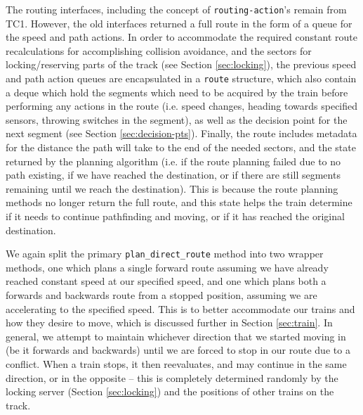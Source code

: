 \documentclass[12pt, titlepage]{article}
\begin{document}
    The routing interfaces, including the concept of \verb`routing-action`'s remain from TC1. However, the old interfaces returned a full route in the form of a queue for the speed and path actions. In order to accommodate the required constant route recalculations for accomplishing collision avoidance, and the sectors for locking/reserving parts of the track (see Section \ref{sec:locking}), the previous speed and path action queues are encapsulated in a \verb`route` structure, which also contain a deque which hold the segments which need to be acquired by the train before performing any actions in the route (i.e. speed changes, heading towards specified sensors, throwing switches in the segment), as well as the decision point for the next segment (see Section \ref{sec:decision-pts}). Finally, the route includes metadata for the distance the path will take to the end of the needed sectors, and the state returned by the planning algorithm (i.e. if the route planning failed due to no path existing, if we have reached the destination, or if there are still segments remaining until we reach the destination). This is because the route planning methods no longer return the full route, and this state helps the train determine if it needs to continue pathfinding and moving, or if it has reached the original destination. 
    
    We again split the primary \verb`plan_direct_route` method into two wrapper methods, one which plans a single forward route assuming we have already reached constant speed at our specified speed, and one which plans both a forwards and backwards route from a stopped position, assuming we are accelerating to the specified speed. This is to better accommodate our trains and how they desire to move, which is discussed further in Section \ref{sec:train}. In general, we attempt to maintain whichever direction that we started moving in (be it forwards and backwards) until we are forced to stop in our route due to a conflict. When a train stops, it then reevaluates, and may continue in the same direction, or in the opposite -- this is completely determined randomly by the locking server (Section \ref{sec:locking}) and the positions of other trains on the track.
    
\end{document}
